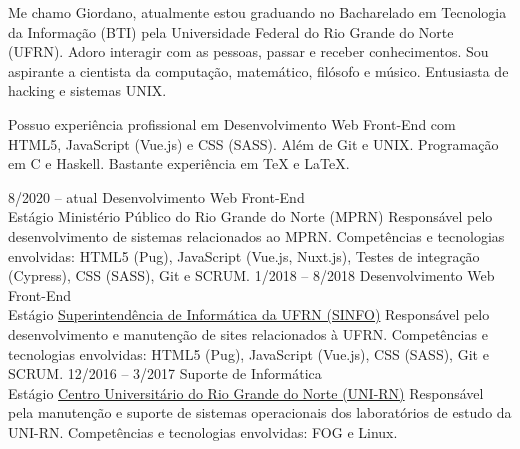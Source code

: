 \documentclass[9pt]{developercv}
\begin{document}
	\maketitle

	\begin{minipage}[t]{1\textwidth}
		Me chamo Giordano, atualmente estou gradu\-ando no Bacharelado em Tecnologia da Informação (BTI) pela Universidade Federal do Rio Grande do Norte (UFRN).
		Adoro interagir com as pessoas, passar e receber conhecimentos. Sou aspirante a cientista da computação, matemático, filósofo e músico. Entusiasta de hacking e sistemas UNIX. 
	\end{minipage}
	
	\begin{minipage}[t]{1\textwidth}
		Possuo experiência profissional em Desenvolvimento Web Front-End com HTML5, JavaScript (Vue.js) e CSS (SASS). Além de Git e UNIX. Programação em C e Haskell. Bastante experiência em \TeX{} e \LaTeX{}.
	\end{minipage}


	\begin{entrylist}
		\entry
			{8/2020 -- atual}
			{Desenvolvimento Web Front-End\\
				\footnotesize{Estágio}}
            {Ministério Público do Rio Grande do Norte (MPRN)}
			{Responsável pelo desenvolvimento de sistemas relacionados ao MPRN.
                Competências e tecnologias envolvidas: HTML5 (Pug), JavaScript (Vue.js, Nuxt.js), Testes de integração (Cypress), CSS (SASS), Git e SCRUM.}
		\entry
			{1/2018 -- 8/2018}
			{Desenvolvimento Web Front-End\\
				\footnotesize{Estágio}}
			{\href{https://www.info.ufrn.br/}{Superintendência de Informática da UFRN (SINFO)}}
			{Responsável pelo desenvolvimento e manutenção de sites relacionados à UFRN.
				Competências e tecnologias envolvidas: HTML5 (Pug), JavaScript (Vue.js), CSS (SASS), Git e SCRUM.}
		\entry
			{12/2016 -- 3/2017}
			{Suporte de Informática\\
				\footnotesize{Estágio}}
			{\href{http://unirn.edu.br/}{Centro Universitário do Rio Grande do Norte (UNI-RN)}}
			{Responsável pela manutenção e suporte de sistemas operacionais dos laboratórios de estudo da UNI-RN.
				Competências e tecnologias envolvidas: FOG e Linux.}
	\end{entrylist}
\end{document}
